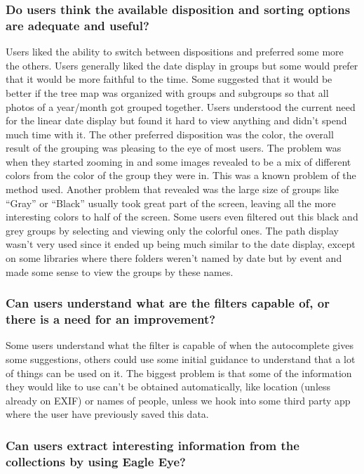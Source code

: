 \subsubsection{Do users think the available disposition and sorting options are adequate and useful?}
Users liked the ability to switch between dispositions and preferred some more the others.
Users generally liked the date display in groups but some would prefer that it would be more faithful to the time. Some suggested that it would be better if the tree map was organized with groups and subgroups so that all photos of a year/month got grouped together. Users understood the current need for the linear date display but found it hard to view anything and didn't spend much time with it.
The other preferred disposition was the color, the overall result of the grouping was pleasing to the eye of most users. The problem was when they started zooming in and some images revealed to be a mix of different colors from the color of the group they were in. This was a known problem of the method used. Another problem that revealed was the large size of groups like ``Gray'' or ``Black'' usually took great part of the screen, leaving all the more interesting colors to half of the screen. Some users even filtered out this black and grey groups by selecting and viewing only the colorful ones.
The path display wasn't very used since it ended up being much similar to the date display, except on some libraries where there folders weren't named by date but by event and made some sense to view the groups by these names. 

\subsubsection{Can users understand what are the filters capable of, or there is a need for an improvement?}
Some users understand what the filter is capable of when the autocomplete gives some suggestions, others could use some initial guidance to understand that a lot of things can be used on it. The biggest problem is that some of the information they would like to use can't be obtained automatically, like location (unless already on EXIF) or names of people, unless we hook into some third party app where the user have previously saved this data.

\subsubsection{Can users extract interesting information from the collections by using Eagle Eye?}


